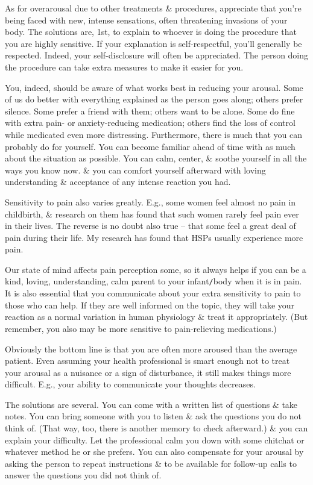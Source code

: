 \documentclass{article}
\numberwithin{equation}{section}
\begin{document}
As for overarousal due to other treatments \& procedures, appreciate that you're being faced with new, intense sensations, often threatening invasions of your body. The solutions are, 1st, to explain to whoever is doing the procedure that you are highly sensitive. If your explanation is self-respectful, you'll generally be respected. Indeed, your self-disclosure will often be appreciated. The person doing the procedure can take extra measures to make it easier for you.

You, indeed, should be aware of what works best in reducing your arousal. Some of us do better with everything explained as the person goes along; others prefer silence. Some prefer a friend with them; others want to be alone. Some do fine with extra pain- or anxiety-reducing medication; others find the loss of control while medicated even more distressing. Furthermore, there is much that you can probably do for yourself. You can become familiar ahead of time with as much about the situation as possible. You can calm, center, \& soothe yourself in all the ways you know now. \& you can comfort yourself afterward with loving understanding \& acceptance of any intense reaction you had.

Sensitivity to pain also varies greatly. E.g., some women feel almost no pain in childbirth, \& research on them has found that such women rarely feel pain ever in their lives. The reverse is no doubt also true -- that some feel a great deal of pain during their life. My research has found that HSPs usually experience more pain.

Our state of mind affects pain perception some, so it always helps if you can be a kind, loving, understanding, calm parent to your infant{\tt/}body when it is in pain. It is also essential that you communicate about your extra sensitivity to pain to those who can help. If they are well informed on the topic, they will take your reaction as a normal variation in human physiology \& treat it appropriately. (But remember, you also may be more sensitive to pain-relieving medications.)

Obviously the bottom line is that you are often more aroused than the average patient. Even assuming your health professional is smart enough not to treat your arousal as a nuisance or a sign of disturbance, it still makes things more difficult. E.g., your ability to communicate your thoughts decreases.

The solutions are several. You can come with a written list of questions \& take notes. You can bring someone with you to listen \& ask the questions you do not think of. (That way, too, there is another memory to check afterward.) \& you can explain your difficulty. Let the professional calm you down with some chitchat or whatever method he or she prefers. You can also compensate for your arousal by asking the person to repeat instructions \& to be available for follow-up calls to answer the questions you did not think of.
\end{document}
